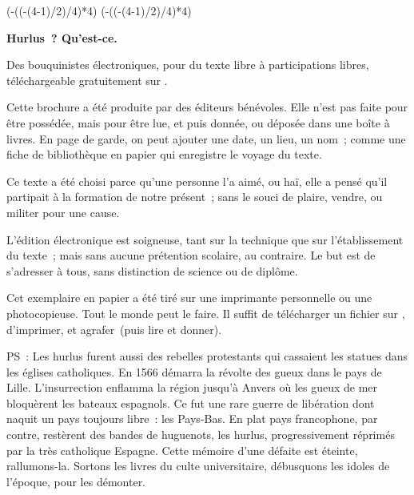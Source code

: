 \documentclass[french,twoside]{book} %
\def\truncdiv#1#2{((#1-(#2-1)/2)/#2)}
\def\moduloop#1#2{(#1-\truncdiv{#1}{#2}*#2)}
\def\modulo#1#2{\number\numexpr\moduloop{#1}{#2}\relax}
\begin{document}
 


\ifbooklet
  \pagestyle{empty}
  \clearpage
  \ifnum\modulo{\value{page}}{4}=0 \hbox{}\newpage\hbox{}\newpage\fi
  \ifnum\modulo{\value{page}}{4}=1 \hbox{}\newpage\hbox{}\newpage\fi


  \hbox{}\newpage
  \ifodd\value{page}\hbox{}\newpage\fi
  {\centering\color{rubric}\bfseries\noindent\large
    Hurlus ? Qu’est-ce.\par
    \bigskip
  }
  \noindent Des bouquinistes électroniques, pour du texte libre à participations libres,
  téléchargeable gratuitement sur \href{https://hurlus.fr}{}.\par
  \bigskip
  \noindent Cette brochure a été produite par des éditeurs bénévoles.
  Elle n’est pas faite pour être possédée, mais pour être lue, et puis donnée, ou déposée dans une boîte à livres.
  En page de garde, on peut ajouter une date, un lieu, un nom ;
  comme une fiche de bibliothèque en papier qui enregistre le voyage du texte.
  \par

  Ce texte a été choisi parce qu’une personne l’a aimé,
  ou haï, elle a pensé qu’il partipait à la formation de notre présent ;
  sans le souci de plaire, vendre, ou militer pour une cause.
  \par

  L’édition électronique est soigneuse, tant sur la technique
  que sur l’établissement du texte ; mais sans aucune prétention scolaire, au contraire.
  Le but est de s’adresser à tous, sans distinction de science ou de diplôme.
  \par

  Cet exemplaire en papier a été tiré sur une imprimante personnelle
   ou une photocopieuse. Tout le monde peut le faire.
  Il suffit de
  télécharger un fichier sur \href{https://hurlus.fr}{},
  d’imprimer, et agrafer (puis lire et donner).\par

  \bigskip

  \noindent PS : Les hurlus furent aussi des rebelles protestants qui cassaient les statues dans les églises catholiques. En 1566 démarra la révolte des gueux dans le pays de Lille. L’insurrection enflamma la région jusqu’à Anvers où les gueux de mer bloquèrent les bateaux espagnols.
  Ce fut une rare guerre de libération dont naquit un pays toujours libre : les Pays-Bas.
  En plat pays francophone, par contre, restèrent des bandes de huguenots, les hurlus, progressivement réprimés par la très catholique Espagne.
  Cette mémoire d’une défaite est éteinte, rallumons-la. Sortons les livres du culte universitaire, débusquons les idoles de l’époque, pour les démonter.
\fi
\end{document}
